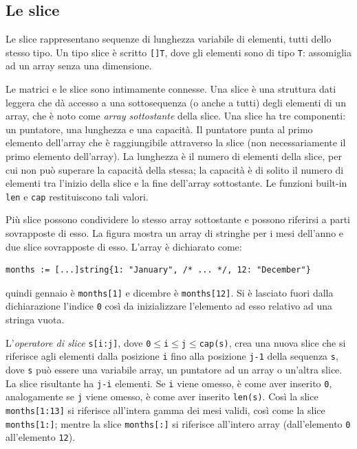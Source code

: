 \documentclass[../../thesis.tex]{subfiles}
\begin{document}
    \subsection{Le slice}\label{subsec:le-slice}
    Le slice rappresentano sequenze di lunghezza variabile di elementi, tutti dello stesso tipo.
    Un tipo slice è scritto \verb"[]T", dove gli elementi sono di tipo \verb"T": assomiglia ad un array senza una dimensione.
    \hfill \vspace{12pt}

    Le matrici e le slice sono intimamente connesse.
    Una slice è una struttura dati leggera che dà accesso a una sottosequenza (o anche a tutti) degli elementi di un array, che è noto come \textit{array sottostante} della slice.
    Una slice ha tre componenti: un puntatore, una lunghezza e una capacità.
    Il puntatore punta al primo elemento dell'array che è raggiungibile attraverso la slice (non necessariamente il primo elemento dell'array).
    La lunghezza è il numero di elementi della slice, per cui non può superare la capacità della stessa;
    la capacità è di solito il numero di elementi tra l'inizio della slice e la fine dell'array sottostante.
    Le funzioni built-in \verb"len" e \verb"cap" restituiscono tali valori.
    \hfill \vspace{12pt}

    Più slice possono condividere lo stesso array sottostante e possono riferirsi a parti sovrapposte di esso.
    La figura mostra un array di stringhe per i mesi dell'anno e due slice sovrapposte di esso.
    L'array è dichiarato come:
    \begin{lstlisting}[label = {lst:lstlisting3-2.1}]
months := [...]string{1: "January", /* ... */, 12: "December"}
    \end{lstlisting}
    quindi gennaio è \verb"months[1]" e dicembre è \verb"months[12]".
    Si è lasciato fuori dalla dichiarazione l'indice \verb"0" così da inizializzare l'elemento ad esso relativo ad una stringa vuota.
    \hfill \vspace{12pt}

    L'\textit{operatore di slice} \verb"s[i:j]", dove \verb"0"$\le$\verb"i"$\le$\verb"j"$\le$\verb"cap(s)", crea una nuova slice che si riferisce agli elementi dalla posizione \verb"i" fino alla posizione \verb"j-1" della sequenza \verb"s", dove \verb"s" può essere una variabile array, un puntatore ad un array o un'altra slice.
    La slice risultante ha \verb"j-i" elementi.
    Se \verb"i" viene omesso, è come aver inserito \verb"0", analogamente se \verb"j" viene omesso, è come aver inserito \verb"len(s)".
    Così la slice \verb"months[1:13]" si riferisce all'intera gamma dei mesi validi, così come la slice \verb"months[1:]"; mentre la slice \verb"months[:]" si riferisce all'intero array (dall'elemento \verb"0" all'elemento \verb"12").
    \hfill \vspace{12pt}
\end{document}
